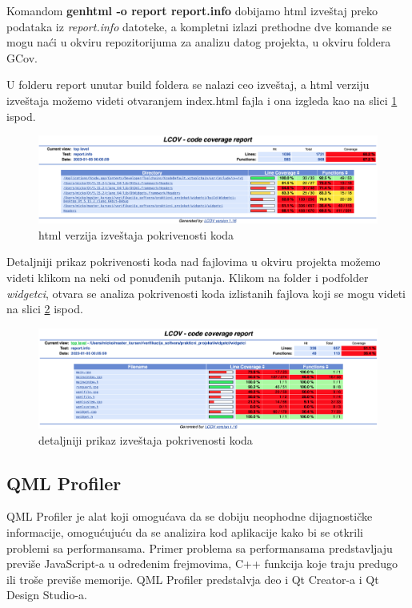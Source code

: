 \documentclass[a4paper]{article}
\begin{document}
Komandom \textbf{genhtml -o report report.info} dobijamo html izveštaj preko podataka iz \textit{report.info} datoteke, a kompletni izlazi prethodne dve komande se mogu naći u okviru repozitorijuma za analizu datog projekta, u okviru foldera GCov.

U folderu report unutar build foldera se nalazi ceo izveštaj, a html verziju izveštaja možemo videti otvaranjem index.html fajla i ona izgleda kao na slici \ref{fig: GCov-02} ispod.

\begin{figure}[h!]
\begin{center}
\includegraphics[scale=0.23]{GCov-02.png}
\end{center}
\caption{html verzija izveštaja pokrivenosti koda}
\label{fig: GCov-02}
\end{figure}

Detaljniji prikaz pokrivenosti koda nad fajlovima u okviru projekta možemo videti klikom na neki od ponuđenih putanja. Klikom na folder i podfolder \textit{widgetci}, otvara se analiza pokrivenosti koda izlistanih fajlova koji se mogu videti na slici \ref{fig: GCov-03} ispod.

\begin{figure}[h!]
\begin{center}
\includegraphics[scale=0.23]{GCov-03.png}
\end{center}
\caption{detaljniji prikaz izveštaja pokrivenosti koda}
\label{fig: GCov-03}
\end{figure}

\subsection{QML Profiler}
QML Profiler je alat koji omogućava da se dobiju neophodne dijagnostičke informacije, omogućujuću da se analizira kod aplikacije kako bi se otkrili problemi sa performansama. Primer problema sa performansama predstavljaju previše JavaScript-a u određenim frejmovima, C++ funkcija koje traju predugo ili troše previše memorije.
QML Profiler predstalvja deo i Qt Creator-a i Qt Design Studio-a.
\end{document}
